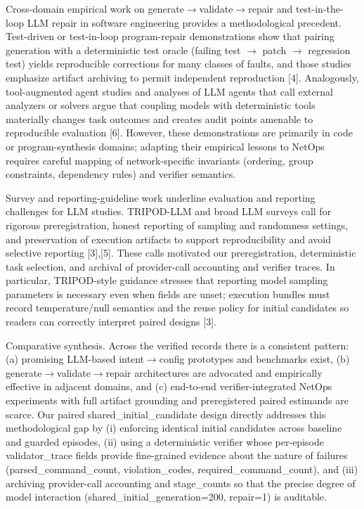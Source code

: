\documentclass[conference]{IEEEtran}
\begin{document}
Cross-domain empirical work on generate\ensuremath{\rightarrow}validate\ensuremath{\rightarrow}repair and test-in-the-loop LLM repair in software engineering provides a methodological precedent. Test-driven or test-in-loop program-repair demonstrations show that pairing generation with a deterministic test oracle (failing test \ensuremath{\rightarrow} patch \ensuremath{\rightarrow} regression test) yields reproducible corrections for many classes of faults, and those studies emphasize artifact archiving to permit independent reproduction [4]. Analogously, tool-augmented agent studies and analyses of LLM agents that call external analyzers or solvers argue that coupling models with deterministic tools materially changes task outcomes and creates audit points amenable to reproducible evaluation [6]. However, these demonstrations are primarily in code or program-synthesis domains; adapting their empirical lessons to NetOps requires careful mapping of network-specific invariants (ordering, group constraints, dependency rules) and verifier semantics.

Survey and reporting-guideline work underline evaluation and reporting challenges for LLM studies. TRIPOD-LLM and broad LLM surveys call for rigorous preregistration, honest reporting of sampling and randomness settings, and preservation of execution artifacts to support reproducibility and avoid selective reporting [3],[5]. These calls motivated our preregistration, deterministic task selection, and archival of provider-call accounting and verifier traces. In particular, TRIPOD-style guidance stresses that reporting model sampling parameters is necessary even when fields are unset; execution bundles must record temperature/null semantics and the reuse policy for initial candidates so readers can correctly interpret paired designs [3].

Comparative synthesis. Across the verified records there is a consistent pattern: (a) promising LLM-based intent\ensuremath{\rightarrow}config prototypes and benchmarks exist, (b) generate\ensuremath{\rightarrow}validate\ensuremath{\rightarrow}repair architectures are advocated and empirically effective in adjacent domains, and (c) end-to-end verifier-integrated NetOps experiments with full artifact grounding and preregistered paired estimands are scarce. Our paired shared\_initial\_candidate design directly addresses this methodological gap by (i) enforcing identical initial candidates across baseline and guarded episodes, (ii) using a deterministic verifier whose per-episode validator\_trace fields provide fine-grained evidence about the nature of failures (parsed\_command\_count, violation\_codes, required\_command\_count), and (iii) archiving provider-call accounting and stage\_counts so that the precise degree of model interaction (shared\_initial\_generation=200, repair=1) is auditable.
\end{document}
